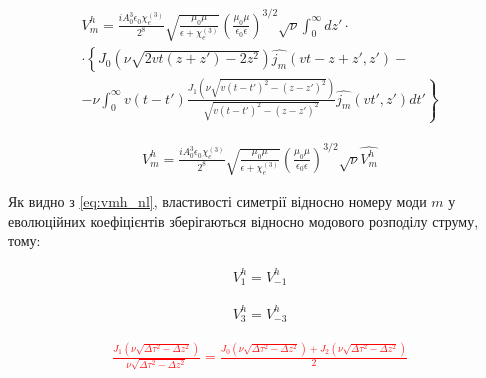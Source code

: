 %
\begin{equation} \begin{aligned} \label{eq:vmh_nl}
V_m^h = \frac{i A_0^3 \epsilon_0 \chi_e^{(3)}}{2^8}
\sqrt{\frac{\mu_0 \mu}{\epsilon + \chi_e^{(3)}}} 
\left( \frac{\mu_0 \mu}{\epsilon_0 \epsilon} \right)^{3/2} \sqrt{\nu}
\int_0^\infty dz' \cdot \\ \cdot 
\left\{ J_0 \left( \nu \sqrt{2 vt (z + z') - 2 z^2} \right) 
\hat{j_m} (vt - z + z',z') - \right. \\ 
\left. - \nu \int_0^\infty v (t-t') 
\frac{J_1 \left( \nu \sqrt{v(t-t')^2 - (z-z')^2} \right)}
{\sqrt{v(t-t')^2 - (z-z')^2}} \hat{j_m} (vt',z') dt' \right\}
\end{aligned} \end{equation}

\begin{equation} \begin{aligned} \label{eq:vmh_norm}
V_m^h = \frac{i A_0^3 \epsilon_0 \chi_e^{(3)}}{2^8}
\sqrt{\frac{\mu_0 \mu}{\epsilon + \chi_e^{(3)}}} 
\left( \frac{\mu_0 \mu}{\epsilon_0 \epsilon} \right)^{3/2} 
\sqrt{\nu} \hat{V_m^h}
\end{aligned} \end{equation}

Як видно з \eqref{eq:vmh_nl}, властивості симетрії відносно номеру моди 
$ m $ у еволюційних коефіцієнтів зберігаються відносно модового розподілу 
струму, тому:

\begin{equation} \begin{aligned} \label{eq:vp1_vm1}
V_1^h = V_{-1}^h
\end{aligned} \end{equation}

\begin{equation} \begin{aligned} \label{eq:vp3_vm3}
V_3^h = V_{-3}^h
\end{aligned} \end{equation}

\textcolor{red} { \begin{equation*} \begin{aligned}
\frac{J_1 \left( \nu \sqrt{\Delta \tau^2 - \Delta z^2} \right)}
{\nu \sqrt{\Delta \tau^2 - \Delta z^2}} =
\frac{J_0 \left( \nu \sqrt{\Delta \tau^2 - \Delta z^2} \right) +
J_2 \left( \nu \sqrt{\Delta \tau^2 - \Delta z^2} \right)}{2}
\end{aligned} \end{equation*} }


